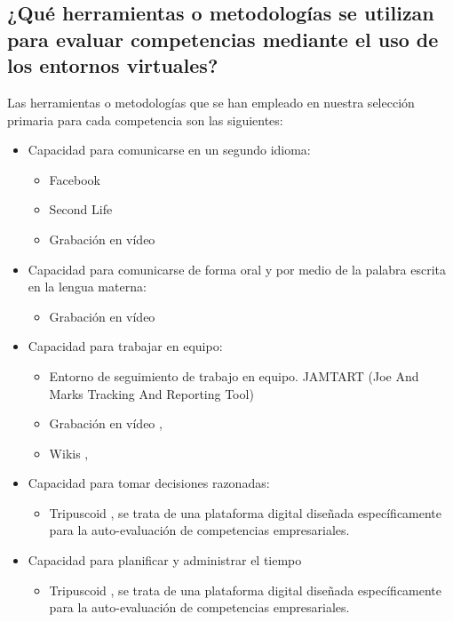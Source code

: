\subsection{¿Qué herramientas o metodologías se utilizan para evaluar competencias mediante el uso de los entornos virtuales?}
Las herramientas o metodologías que se han empleado en nuestra selección primaria para cada competencia son las siguientes:
\begin{itemize}
\item Capacidad para comunicarse en un segundo idioma:
	\begin{itemize} 
	\item Facebook \cite{Shih:2011}
	\item Second Life \cite{MercedesRico:2013}
	\item Grabación en vídeo \cite{Masip-Alvarez:2013}
	\end{itemize}
\item Capacidad para comunicarse de forma oral y por medio de la palabra escrita en la lengua materna:
	\begin{itemize} 
	\item Grabación en vídeo \cite{Masip-Alvarez:2013}
	\end{itemize}
\item Capacidad para trabajar en equipo:
	\begin{itemize} 
	\item Entorno de seguimiento de trabajo en equipo. JAMTART (Joe And Marks Tracking And Reporting Tool) \cite{McMahon:2007}
	\item Grabación en vídeo \cite{Masip-Alvarez:2013}, \cite{Martin-Cuadrado:2013}
	\item Wikis \cite{Piedra:2010}, \cite{Lim:2011}
	\end{itemize}
\item Capacidad para tomar decisiones razonadas:
	\begin{itemize} 
	\item Tripuscoid \cite{Achcaoucaou:2012}, se trata de una plataforma digital diseñada específicamente para la auto-evaluación de competencias empresariales.
	\end{itemize}
\item Capacidad para planificar y administrar el tiempo
	\begin{itemize} 
	\item Tripuscoid \cite{Achcaoucaou:2012}, se trata de una plataforma digital diseñada específicamente para la auto-evaluación de competencias empresariales.

\end{itemize}
\end{itemize}
